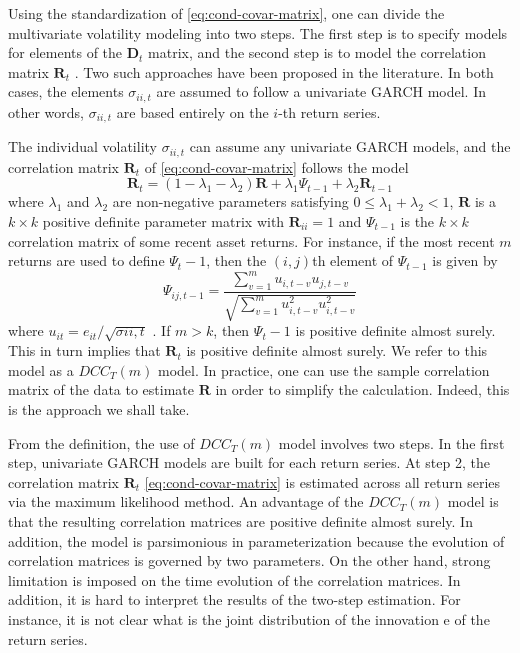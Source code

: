 Using the standardization of \eqref{eq:cond-covar-matrix}, one can divide the multivariate volatility modeling into two steps. The first step is to specify models for elements of the $\mathbf{D}_t$ matrix, and the second step is to model the correlation matrix $\mathbf{R}_t$ . Two such approaches have been proposed in the literature. In both cases, the elements $\sigma_{ii,t}$ are assumed to follow a univariate GARCH model. In other words, $\sigma_{ii,t}$ are based entirely on the $i$-th return series. 

The individual volatility $\sigma_{ii,t}$ can assume any univariate GARCH models, and the correlation matrix $\mathbf{R}_t$ of \eqref{eq:cond-covar-matrix} follows the model
\begin{equation}
\mathbf{R}_t = (1-\lambda_1 -\lambda_2)\mathbf{R} + \lambda_1 \Psi_{t-1} + \lambda_2 \mathbf{R}_{t-1}
\label{eq:dyn-corr}
\end{equation}
where $\lambda_1$ and $\lambda_2$ are non-negative parameters satisfying $0 \le \lambda_1 + \lambda_2 < 1$, $\mathbf{R}$ is a $k \times k$ positive definite parameter matrix with $\mathbf{R}_{ii} = 1$ and $\Psi_{t-1}$ is the $k \times k$ correlation matrix of some recent asset returns. For instance, if the most recent $m$ returns are 
used to define $\Psi_t-1$, then the $(i, j )$th element of $\Psi_{t-1}$ is given by
\[
\Psi_{ij,t-1} = \frac{\sum^m_{v=1}u_{i,t-v}u_{j,t-v}}{\sqrt{\sum^m_{v=1}u^2_{i,t-v} u^2_{i,t-v}}}  
\]
where $u_{it} = e_{it} / \sqrt{\sigma{ii,t}}$ . If $m > k$, then $\Psi_t-1$ is positive definite almost surely. This in turn implies that $\mathbf{R}_t$ is positive definite almost surely. We refer to this model as a $DCC_T(m)$ model. In practice, one can use the sample correlation matrix of the data to estimate $\mathbf{R}$ in order to simplify the calculation. Indeed, this is the approach we shall take.

From the definition, the use of $DCC_T(m)$ model involves two steps. In the first step, univariate GARCH models are built for each return series. At step 2, the correlation matrix $\mathbf{R}_t$ \eqref{eq:cond-covar-matrix} is estimated across all return series via the maximum likelihood method. An advantage of the $DCC_T (m)$ model is that the resulting correlation matrices are positive definite almost surely. In addition, the model is parsimonious in parameterization because the evolution of correlation matrices is governed by two parameters. On the other hand, strong limitation is imposed on the time evolution of the correlation matrices. In addition, it is hard to interpret the results of the two-step estimation. For instance, it is not clear what is the joint distribution of the innovation e of the return series. 

